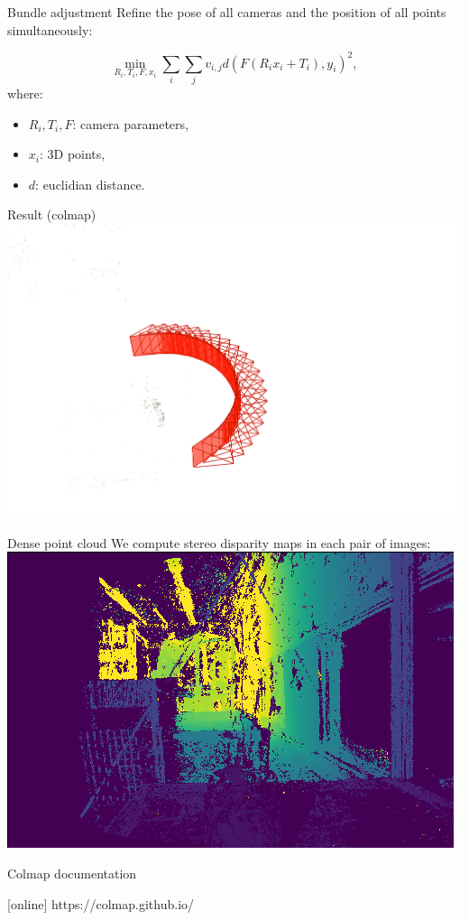 \documentclass[aspectratio=169]{beamer}
\begin{document}
\begin{frame}{Bundle adjustment}
    Refine the pose of all cameras and the position of all points simultaneously:

    \[
        \min_{R_i, T_i, F, x_i} \sum_i \sum_j v_{i,j} d(F(R_i x_i + T_i), y_i)^2,
    \]
    where:
    \begin{itemize}
        \item $R_i, T_i, F$: camera parameters,
        \item $x_i$: 3D points,
        \item $d$: euclidian distance.
    \end{itemize}
\end{frame}
\begin{frame}{Result (colmap)}
    \centering
    \includegraphics[height=0.8\textheight]{images/poses.png}
\end{frame}
\begin{frame}{Dense point cloud}
    We compute stereo disparity maps in each pair of images:
    \includegraphics[width=\textwidth]{images/depthmap.png}
\end{frame}
\begin{frame}{Colmap documentation}
    \begin{thebibliography}{9}
        [online]
         https://colmap.github.io/
    \end{thebibliography}
\end{frame}
\end{document}
